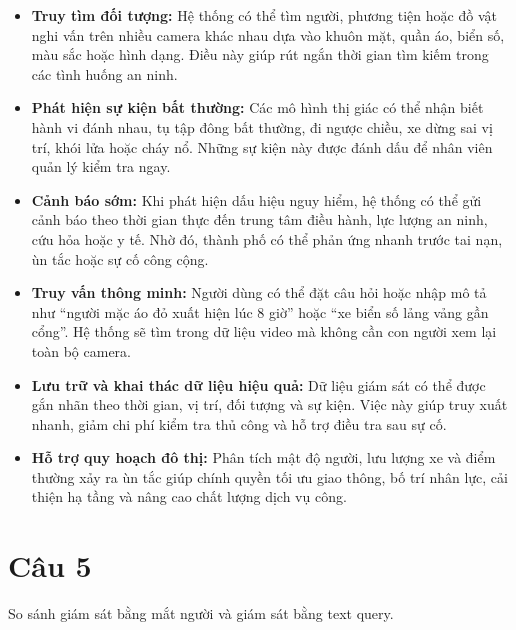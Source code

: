 \begin{itemize}
    \item \textbf{Truy tìm đối tượng:} Hệ thống có thể tìm người, phương tiện hoặc đồ vật nghi vấn trên nhiều camera khác nhau dựa vào khuôn mặt, quần áo, biển số, màu sắc hoặc hình dạng. Điều này giúp rút ngắn thời gian tìm kiếm trong các tình huống an ninh.

    \item \textbf{Phát hiện sự kiện bất thường:} Các mô hình thị giác có thể nhận biết hành vi đánh nhau, tụ tập đông bất thường, đi ngược chiều, xe dừng sai vị trí, khói lửa hoặc cháy nổ. Những sự kiện này được đánh dấu để nhân viên quản lý kiểm tra ngay.

    \item \textbf{Cảnh báo sớm:} Khi phát hiện dấu hiệu nguy hiểm, hệ thống có thể gửi cảnh báo theo thời gian thực đến trung tâm điều hành, lực lượng an ninh, cứu hỏa hoặc y tế. Nhờ đó, thành phố có thể phản ứng nhanh trước tai nạn, ùn tắc hoặc sự cố công cộng.

    \item \textbf{Truy vấn thông minh:} Người dùng có thể đặt câu hỏi hoặc nhập mô tả như ``người mặc áo đỏ xuất hiện lúc 8 giờ'' hoặc ``xe biển số lảng vảng gần cổng''. Hệ thống sẽ tìm trong dữ liệu video mà không cần con người xem lại toàn bộ camera.

    \item \textbf{Lưu trữ và khai thác dữ liệu hiệu quả:} Dữ liệu giám sát có thể được gắn nhãn theo thời gian, vị trí, đối tượng và sự kiện. Việc này giúp truy xuất nhanh, giảm chi phí kiểm tra thủ công và hỗ trợ điều tra sau sự cố.

    \item \textbf{Hỗ trợ quy hoạch đô thị:} Phân tích mật độ người, lưu lượng xe và điểm thường xảy ra ùn tắc giúp chính quyền tối ưu giao thông, bố trí nhân lực, cải thiện hạ tầng và nâng cao chất lượng dịch vụ công.
\end{itemize}


\section*{Câu 5}
So sánh giám sát bằng mắt người và giám sát bằng text query.

